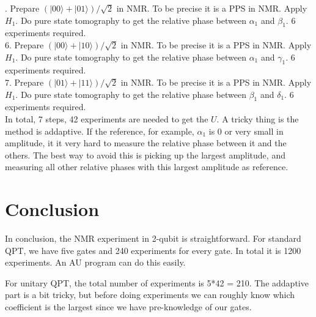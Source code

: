 \documentclass[12pt,nofootinbib,notitlepage,onecolumn,superscriptaddress]{revtex4-1}
\theoremstyle{plain}
\theoremstyle{definition}
\newcommand{\ket}[1]{\ensuremath{|#1\rangle}}
\begin{document}
\medskip

. Prepare $(\ket{00}+\ket{01})/\sqrt{2}$ in NMR. To be precise it is a PPS in NMR. Apply $H_1$. Do pure state tomography to get the relative phase between $\alpha_1$ and $\beta_1$. 6 experiments required.\\
6. Prepare $(\ket{00}+\ket{10})/\sqrt{2}$ in NMR. To be precise it is a PPS in NMR. Apply $H_1$. Do pure state tomography to get the relative phase between $\alpha_1$ and $\gamma_1$. 6 experiments required.\\
7. Prepare $(\ket{01}+\ket{11})/\sqrt{2}$ in NMR. To be precise it is a PPS in NMR. Apply $H_1$. Do pure state tomography to get the relative phase between $\beta_1$ and $\delta_1$. 6 experiments required.\\

In total, 7 steps, 42 experiments are needed to get the $U$. A tricky thing is the method is addaptive. If the reference, for example, $\alpha_1$ is 0 or very small in amplitude, it it very hard to measure the relative phase between it and the others. The best way to avoid this is picking up the largest amplitude, and measuring all other relative phases with this largest amplitude as reference.

\section{Conclusion}

In conclusion, the NMR experiment in 2-qubit is straightforward. For standard QPT, we have five gates and 240 experiments for every gate. In total it is 1200 experiments. An AU program can do this easily.

For unitary QPT, the total number of experiments is 5*42 = 210. The addaptive part is a bit tricky, but before doing experiments we can roughly know which coefficient is the largest since we have pre-knowledge of our gates. 
\end{document}
